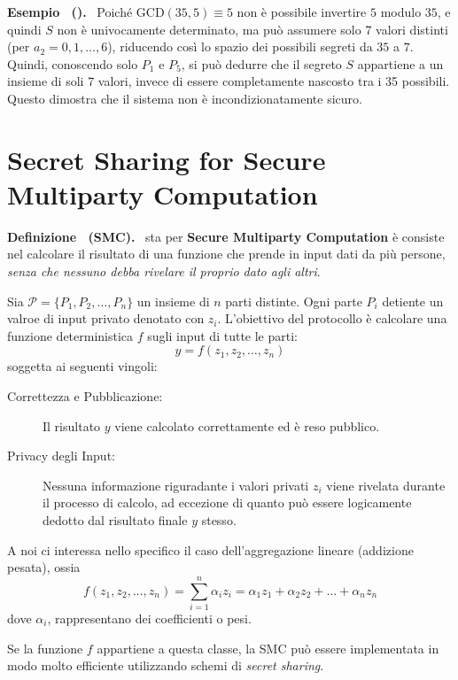 \documentclass[a4paper, 11pt]{article}
\newenvironment{example}[1][]{
  \par\noindent\textbf{Esempio%
  \if\relax\detokenize{#1}\relax\else\ (\textbf{#1})\fi.}\ }{}
\newenvironment{definition}[1][]{
  \par\noindent\textbf{Definizione%
  \if\relax\detokenize{#1}\relax\else\ (\textbf{#1})\fi.}\ }{}
\begin{document}
\begin{example}
    Poiché $\text{GCD}(35, 5) \equiv 5$ non è possibile invertire $5$ modulo $35$, e quindi $S$ non è univocamente determinato, ma può assumere solo 7 valori distinti (per $a_2 = 0, 1, \dots, 6$), riducendo così lo spazio dei possibili segreti da $35$ a $7$. Quindi, conoscendo solo $P_1$ e $P_5$, si può dedurre che il segreto $S$ appartiene a un insieme di soli 7 valori, invece di essere completamente nascosto tra i 35 possibili. Questo dimostra che il sistema non è incondizionatamente sicuro. 
\end{example}

\section{Secret Sharing for Secure Multiparty Computation}

\begin{definition}[SMC]
     sta per \textbf{Secure Multiparty Computation} è consiste nel calcolare il risultato di una funzione che prende in input dati da più persone, \textit{senza che nessuno debba rivelare il proprio dato agli altri}.

    Sia $\mathcal{P} = \{P_1, P_2, \dots, P_n\}$ un insieme di $n$ parti distinte. Ogni parte $P_i$ detiente un valroe di input privato denotato con $z_i$. L'obiettivo del protocollo è calcolare una funzione deterministica $f$ sugli input di tutte le parti:
    \[
    y = f(z_1, z_2, \dots, z_n)
    \]
    soggetta ai seguenti vingoli:
    \begin{description}
        \item[Correttezza e Pubblicazione:] Il risultato $y$ viene calcolato correttamente ed è reso pubblico.
        \item[Privacy degli Input:] Nessuna informazione riguradante i valori privati $z_i$ viene rivelata durante il processo di calcolo, ad eccezione di quanto può essere logicamente dedotto dal risultato finale $y$ stesso.
    \end{description}
    A noi ci interessa nello specifico il caso dell'aggregazione lineare (addizione pesata), ossia
    \[
    f(z_1, z_2, \dots, z_n) = \sum_{i = 1}^{n} \alpha_iz_i = \alpha_1z_1 + \alpha_2z_2 + \dots + \alpha_nz_n
    \]
    dove $\alpha_i$, rappresentano dei coefficienti o pesi.

    Se la funzione $f$ appartiene a questa classe, la SMC può essere implementata in modo molto efficiente utilizzando schemi di \textit{secret sharing}.
\end{definition}
\end{document}
